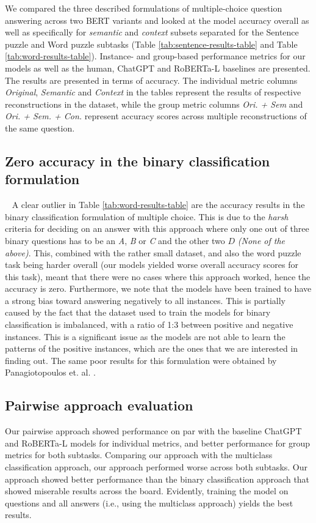 We compared the three described formulations of multiple-choice question answering across two BERT variants and looked at the model accuracy overall as well as specifically for \emph{semantic} and \emph{context} subsets separated for the Sentence puzzle and Word puzzle subtasks (Table \ref{tab:sentence-results-table} and Table \ref{tab:word-results-table}). 
Instance- and group-based performance metrics for our models as well as the human, ChatGPT and RoBERTa-L baselines are presented.
The results are presented in terms of accuracy.
The individual metric columns \emph{Original}, \emph{Semantic} and \emph{Context} in the tables represent the results of respective reconstructions in the dataset, while the group metric columns \emph{Ori. + Sem} and \emph{Ori. + Sem. + Con.} represent accuracy scores across multiple reconstructions of the same question.

\subsection{Zero accuracy in the binary classification formulation} \ %
A clear outlier in Table \ref{tab:word-results-table} are the accuracy results in the binary classification formulation of multiple choice.
This is due to the \emph{harsh} criteria for deciding on an answer with this approach where only one out of three binary questions has to be an \emph{A}, \emph{B} or \emph{C} and the other two $D$ \emph{(None of the above)}.
This, combined with the rather small dataset, and also the word puzzle task being harder overall (our models yielded worse overall accuracy scores for this task), meant that there were no cases where this approach worked, hence the accuracy is zero.
Furthermore, we note that the models have been trained to have a strong bias toward answering negatively to all instances.
This is partially caused by the fact that the dataset used to train the models for binary classification is imbalanced, with a ratio of 1:3 between positive and negative instances.
This is a significant issue as the models are not able to learn the patterns of the positive instances, which are the ones that we are interested in finding out.
The same poor results for this formulation were obtained by Panagiotopoulos et. al. \citep{ails-lab}.

\subsection{Pairwise approach evaluation}
Our pairwise approach showed performance on par with the baseline ChatGPT and RoBERTa-L models\citep{semeval} for individual metrics, and better performance for group metrics for both subtasks.
Comparing our approach with the multiclass classification approach, our approach performed worse across both subtasks.
Our approach showed better performance than the binary classification approach that showed miserable results across the board.
Evidently, training the model on questions and all answers (i.e., using the multiclass approach) yields the best results.